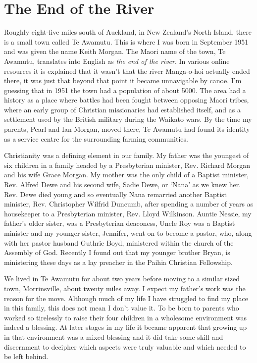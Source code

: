 \chapter{The End of the River}

Roughly eight-five miles south of Auckland, in New Zealand's North
Island, there is a small town called Te Awamutu. This is where I was
born in September 1951 and was given the name Keith Morgan. The Maori
name of the town, Te Awamutu, translates into English as \emph{the end
  of the river}. In various online resources\cite{early-history}
it is explained that it wasn't that the river
Manga-o-hoi actually ended there, it was just that beyond that point it
became unnavigable by canoe. I'm guessing that in 1951 the town had a
population of about 5000. The area had a history as a place where
battles had been fought between opposing Maori tribes, where an early
group of Christian missionaries had established itself, and as a
settlement used by the British military during the Waikato wars. By the
time my parents, Pearl and Ian Morgan, moved there, Te Awamutu had found
its identity as a service centre for the surrounding farming
communities.

Christianity was a defining element in our family. My father was the
youngest of six children in a family headed by a Presbyterian minister,
Rev. Richard Morgan and his wife Grace Morgan. My mother was the only
child of a Baptist minister, Rev. Alfred Dewe and his second wife, Sadie
Dewe, or `Nana' as we knew her. Rev. Dewe died young and so eventually
Nana remarried another Baptist minister, Rev. Christopher Wilfrid
Duncumb, after spending a number of years as housekeeper to a
Presbyterian minister, Rev. Lloyd Wilkinson. Auntie Nessie, my father's
older sister, was a Presbyterian deaconess, Uncle Roy was a Baptist
minister and my younger sister, Jennifer, went on to become a pastor,
who, along with her pastor husband Guthrie Boyd, ministered within the
church of the Assembly of God. Recently I found out that my younger
brother Bryan, is ministering these days as a lay preacher in the Paihia
Christian Fellowship.

We lived in Te Awamutu for about two years before moving to a similar
sized town, Morrinsville, about twenty miles away. I expect my father's
work was the reason for the move. Although much of my life I have
struggled to find my place in this family, this does not mean I don't
value it. To be born to parents who worked so tirelessly to raise their
four children in a wholesome environment was indeed a blessing. At later
stages in my life it became apparent that growing up in that environment
was a mixed blessing and it did take some skill and discernment to
decipher which aspects were truly valuable and which needed to be left
behind.

